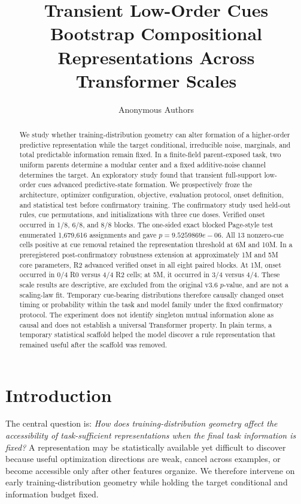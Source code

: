 \documentclass{article}
\title{Transient Low-Order Cues Bootstrap Compositional\\
Representations Across Transformer Scales}
\author{Anonymous Authors}
\begin{document}
\maketitle


\begin{abstract}
We study whether training-distribution geometry can alter formation of a
higher-order predictive representation while the target conditional,
irreducible noise, marginals, and total predictable information remain fixed.
In a finite-field parent-exposed task, two uniform parents determine a modular
center and a fixed additive-noise channel determines the target. An
exploratory study found that transient full-support low-order cues advanced
predictive-state formation. We prospectively froze the architecture,
optimizer configuration, objective, evaluation protocol, onset definition,
and statistical test before confirmatory training. The confirmatory study used
held-out rules, cue permutations, and initializations with three cue doses.
Verified onset occurred in 1/8,
6/8, and 8/8 blocks. The
one-sided exact blocked Page-style test enumerated
1,679,616 assignments and gave
$p=9.5259869e-06$. All 13 nonzero-cue cells
positive at cue removal retained the representation threshold at 6M and 10M.
In a preregistered post-confirmatory robustness extension at approximately
1M and 5M core parameters, R2 advanced verified onset in all eight paired
blocks. At 1M, onset occurred in 0/4 R0 versus 4/4 R2 cells; at 5M, it occurred
in 3/4 versus 4/4. These scale results are descriptive, are excluded from the
original v3.6 $p$-value, and are not a scaling-law fit.
Temporary cue-bearing distributions therefore causally changed onset timing or
probability within the task and model family under the fixed confirmatory
protocol. The experiment does not
identify singleton mutual information alone as causal and does not establish a
universal Transformer property. In plain terms, a temporary statistical
scaffold helped the model discover a rule representation that remained useful
after the scaffold was removed.
\end{abstract}

\section{Introduction}
The central question is: \emph{How does training-distribution geometry affect
the accessibility of task-sufficient representations when the final task
information is fixed?} A representation may be statistically available yet
difficult to discover because useful optimization directions are weak, cancel
across examples, or become accessible only after other features organize. We
therefore intervene on early training-distribution geometry while holding the
target conditional and information budget fixed.
\end{document}
